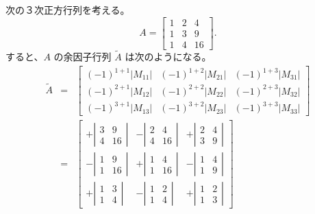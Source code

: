 \begin{eg}
次の３次正方行列を考える。
$$A = \left[\begin{array}{ccc}1 & 2 & 4\\ 1 & 3 & 9\\ 1 & 4 & 16 \end{array}\right].$$
すると、$A$ の余因子行列 $\widetilde{A}$ は次のようになる。
\begin{eqnarray*}
\widetilde{A} & = & 
\left[\begin{array}{ccc}
(-1)^{1+1}|M_{11}| & (-1)^{1+2}|M_{21}| & (-1)^{1+3}|M_{31}| \\
(-1)^{2+1}|M_{12}| & (-1)^{2+2}|M_{22}| & (-1)^{2+3}|M_{32}| \\
(-1)^{3+1}|M_{13}| & (-1)^{3+2}|M_{23}| & (-1)^{3+3}|M_{33}| 
 \end{array}\right]\\
& = & \left[\begin{array}{ccc}
+ \left|\begin{array}{cc} 3 & 9\\ 4 & 16 \end{array}\right|  &
- \left|\begin{array}{cc} 2 & 4\\ 4 & 16 \end{array}\right| &
+ \left|\begin{array}{cc} 2 & 4\\ 3 & 9 \end{array}\right| \\
- \left|\begin{array}{cc} 1 & 9\\ 1 & 16 \end{array}\right| &
+ \left|\begin{array}{cc} 1 & 4\\ 1 & 16 \end{array}\right| &
- \left|\begin{array}{cc} 1 & 4\\ 1 & 9 \end{array}\right| \\
+ \left|\begin{array}{cc} 1 & 3\\ 1 & 4 \end{array}\right| &
- \left|\begin{array}{cc} 1 & 2\\ 1 & 4 \end{array}\right| &
+ \left|\begin{array}{cc} 1 & 2\\ 1 & 3 \end{array}\right| 
\end{array}\right]
\end{eqnarray*}
\end{eg}

